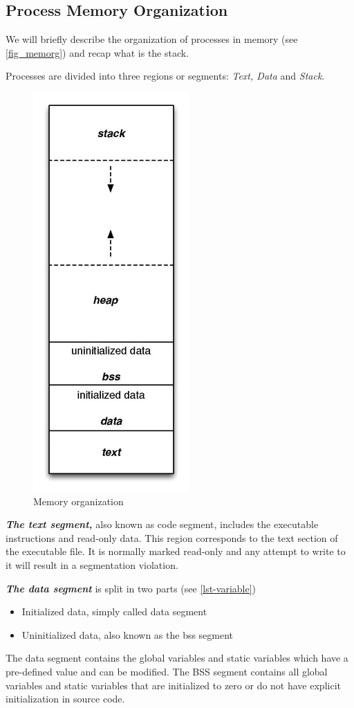 \documentclass[10pt,twocolumn]{article}
\begin{document}
\subsection{Process Memory Organization}
We will briefly describe the
organization of processes in memory (see \autoref{fig_memorg}) and recap what is the stack.

Processes are divided into three regions or segments: \textit{Text, Data} and
\textit{Stack}.

\begin{figure}[h]
  \centering
  \includegraphics[scale=.85]{./graphics/memory_organization.jpg}
  \caption{Memory organization}
  \label{fig_memorg}
\end{figure}

\textbf{\textit{The text segment,}} also known as code segment, includes the
executable instructions and read-only data. This region corresponds to the text
section of the executable file. It is normally marked read-only and any attempt
to write to it will result in a segmentation violation.

\textbf{\textit{The data segment}} is split in two parts (see
\autoref{lst-variable})
\begin{itemize}
\item Initialized data, simply called data segment
\item Uninitialized data, also known as the bss segment
\end{itemize}
    The data segment contains the global variables and static variables
which have a pre-defined value and can be modified. The BSS segment contains
all global variables and static variables that are initialized to zero or do
not have explicit initialization in source code.
\end{document}
